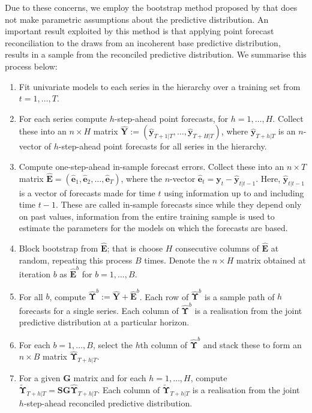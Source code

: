 \documentclass[graybox]{svmult}
\begin{document}
Due to these concerns, we employ the bootstrap method proposed by \citet{GamEtAl2018} that does not make parametric assumptions about the predictive distribution. An important result exploited by this method is that applying point forecast reconciliation to the draws from an incoherent base predictive distribution, results in a sample from the reconciled predictive distribution. We summarise this process below:


\begin{enumerate}
	\item Fit univariate models to each series in the hierarchy over a training set from $t=1,\dots,T$.
	\item For each series compute $h$-step-ahead point forecasts, for $h=1,\dots,H$. Collect these into an $n\times H$ matrix $\hat{\bm{Y}}:=(\hat{\bm{y}}_{T+1|T},\dots,\hat{\bm{y}}_{T+H|T})$, where $\hat{\bm{y}}_{T+h|T}$ is an $n$-vector of $h$-step-ahead point forecasts for all series in the hierarchy.
	\item Compute one-step-ahead in-sample forecast errors. Collect these into an $n \times T$ matrix ${\hat{\bm E}}=(\hat{\bm{e}}_1,\hat{\bm{e}}_2,\dots,\hat{\bm{e}}_T)$, where the $n$-vector $\hat{\bm{e}}_t={\bm{y}}_t-\hat{\bm {y}}_{t|t-1}$. Here, $\hat{\bm {y}}_{t|t-1}$ is a vector of forecasts made for time $t$ using information up to and including time $t-1$. These are called in-sample forecasts since while they depend only on past values, information from the entire training sample is used to estimate the parameters for the models on which the forecasts are based.
	\item Block bootstrap from $\hat{\bm{E}}$; that is choose $H$ consecutive columns of $\hat{{\bm E}}$ at random, repeating this process $B$ times. Denote the $n\times H$ matrix obtained at iteration $b$ as $\hat{{\bm E}}^b$ for $b=1,\dots,B$.
	\item For all $b$, compute $\hat{\bm\Upsilon}^b:=\hat{\bm{Y}}+\hat{\bm{E}}^b$. Each row of $\hat{\bm \Upsilon}^b$ is a sample path of $h$ forecasts for a single series. Each column of $\hat{\bm \Upsilon}^b$ is a realisation from the joint predictive distribution at a particular horizon.
	\item For each $b=1,\dots,B$, select the $h$th column of $\hat{\bm \Upsilon}^b$ and stack these to form an $n\times B$ matrix $\hat{\bm{\Upsilon}}_{T+h|T}$.
	\item For a given ${\bm G}$ matrix and for each $h=1,\dots,H$, compute $\tilde{\bm{\Upsilon}}_{T+h|T}={\bm S}{\bm G}\hat{\bm{\Upsilon}}_{T+h|T}$.  Each column of $\tilde{\bm \Upsilon}_{T+h|T}$ is a realisation from the joint $h$-step-ahead reconciled predictive distribution.
\end{enumerate}
\end{document}

